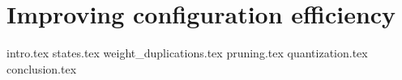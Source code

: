 \chapter{Improving configuration efficiency}
\label{ch:7}
{intro.tex}
{states.tex}
{weight_duplications.tex}
{pruning.tex}
{quantization.tex}
{conclusion.tex}
